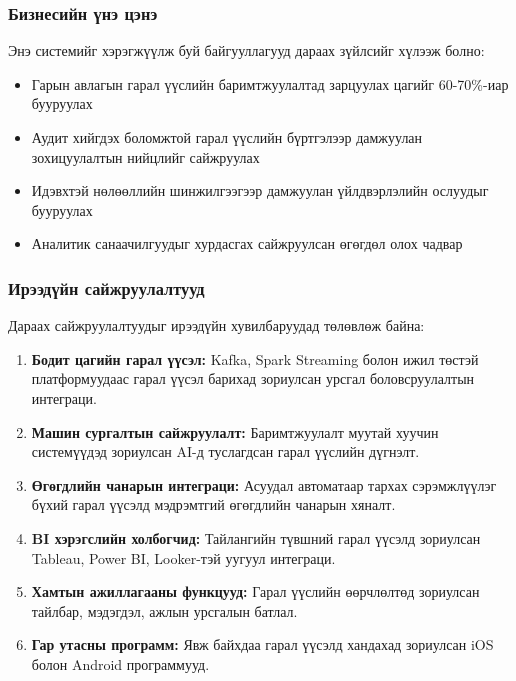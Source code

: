 \subsubsection{Бизнесийн үнэ цэнэ}

Энэ системийг хэрэгжүүлж буй байгууллагууд дараах зүйлсийг хүлээж болно:
\begin{itemize}
    \item Гарын авлагын гарал үүслийн баримтжуулалтад зарцуулах цагийг 60-70\%-иар бууруулах
    \item Аудит хийгдэх боломжтой гарал үүслийн бүртгэлээр дамжуулан зохицуулалтын нийцлийг сайжруулах
    \item Идэвхтэй нөлөөллийн шинжилгээгээр дамжуулан үйлдвэрлэлийн ослуудыг бууруулах
    \item Аналитик санаачилгуудыг хурдасгах сайжруулсан өгөгдөл олох чадвар
\end{itemize}

\subsubsection{Ирээдүйн сайжруулалтууд}

Дараах сайжруулалтуудыг ирээдүйн хувилбаруудад төлөвлөж байна:

\begin{enumerate}
    \item \textbf{Бодит цагийн гарал үүсэл:} Kafka, Spark Streaming болон ижил төстэй платформуудаас гарал үүсэл барихад зориулсан урсгал боловсруулалтын интеграци.
    
    \item \textbf{Машин сургалтын сайжруулалт:} Баримтжуулалт муутай хуучин системүүдэд зориулсан AI-д туслагдсан гарал үүслийн дүгнэлт.
    
    \item \textbf{Өгөгдлийн чанарын интеграци:} Асуудал автоматаар тархах сэрэмжлүүлэг бүхий гарал үүсэлд мэдрэмтгий өгөгдлийн чанарын хяналт.
    
    \item \textbf{BI хэрэгслийн холбогчид:} Тайлангийн түвшний гарал үүсэлд зориулсан Tableau, Power BI, Looker-тэй уугуул интеграци.
    
    \item \textbf{Хамтын ажиллагааны функцууд:} Гарал үүслийн өөрчлөлтөд зориулсан тайлбар, мэдэгдэл, ажлын урсгалын батлал.
    
    \item \textbf{Гар утасны программ:} Явж байхдаа гарал үүсэлд хандахад зориулсан iOS болон Android программууд.
\end{enumerate}

